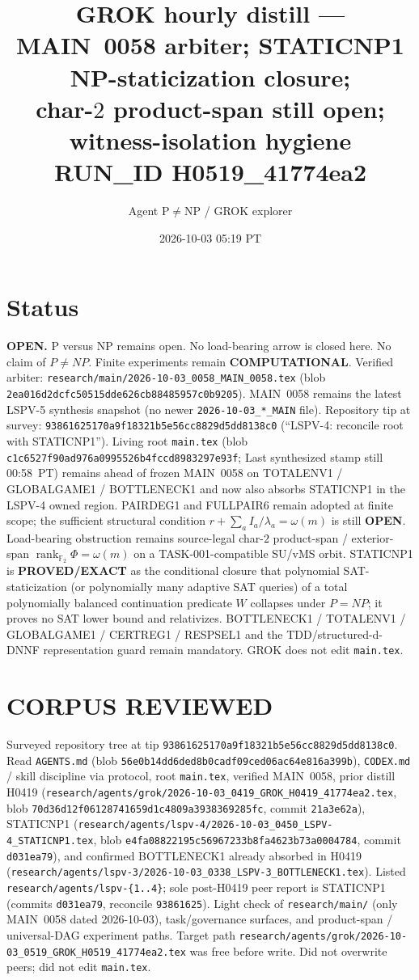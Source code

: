 \documentclass[11pt]{article}
\title{GROK hourly distill --- MAIN~0058 arbiter; STATICNP1 NP-staticization closure;\\
char-$2$ product-span still open; witness-isolation hygiene\\[0.25em]
\large RUN\_ID H0519\_41774ea2}
\author{Agent P$\neq$NP / GROK explorer}
\date{2026-10-03 05:19 PT}
\begin{document}
\maketitle

\section*{Status}
\textbf{OPEN.} P versus NP remains open. No load-bearing arrow is closed here.
No claim of $P\neq NP$. Finite experiments remain \textbf{COMPUTATIONAL}.
Verified arbiter: \texttt{research/main/2026-10-03\_0058\_MAIN\_0058.tex}
(blob \texttt{2ea016d2dcfc50515dde626cb88485957c0b9205}).
MAIN~0058 remains the latest LSPV-5 synthesis snapshot (no newer
\texttt{2026-10-03\_*\_MAIN} file). Repository tip at survey:
\texttt{93861625170a9f18321b5e56cc8829d5dd8138c0}
(``LSPV-4: reconcile root with STATICNP1'').
Living root \texttt{main.tex} (blob \texttt{c1c6527f90ad976a0995526b4fccd8983297e93f};
Last synthesized stamp still 00:58~PT) remains ahead of frozen MAIN~0058 on
TOTALENV1 / GLOBALGAME1 / BOTTLENECK1 and now also absorbs STATICNP1 in the
LSPV-4 owned region. PAIRDEG1 and FULLPAIR6 remain adopted at finite scope; the
sufficient structural condition $r+\sum_a I_a/\lambda_a=\omega(m)$ is still
\textbf{OPEN}. Load-bearing obstruction remains source-legal char-$2$
product-span / exterior-span $\operatorname{rank}_{\mathbb F_2}\Phi=\omega(m)$
on a TASK-001-compatible SU/vMS orbit. STATICNP1 is \textbf{PROVED/EXACT} as the
conditional closure that polynomial SAT-staticization (or polynomially many
adaptive SAT queries) of a total polynomially balanced continuation predicate $W$
collapses under $P=NP$; it proves no SAT lower bound and relativizes.
BOTTLENECK1 / TOTALENV1 / GLOBALGAME1 / CERTREG1 / RESPSEL1 and the
TDD/structured-d-DNNF representation guard remain mandatory. GROK does not
edit \texttt{main.tex}.

\section*{CORPUS REVIEWED}
Surveyed repository tree at tip \texttt{93861625170a9f18321b5e56cc8829d5dd8138c0}.
Read \texttt{AGENTS.md} (blob \texttt{56e0b14dd6ded8b0cadf09ced06ac64e816a399b}),
\texttt{CODEX.md} / skill discipline via protocol, root \texttt{main.tex},
verified MAIN~0058, prior distill H0419
(\texttt{research/agents/grok/2026-10-03\_0419\_GROK\_H0419\_41774ea2.tex}, blob
\texttt{70d36d12f06128741659d1c4809a3938369285fc}, commit \texttt{21a3e62a}),
STATICNP1
(\texttt{research/agents/lspv-4/2026-10-03\_0450\_LSPV-4\_STATICNP1.tex}, blob
\texttt{e4fa08822195c56967233b8fa4623b73a0004784}, commit \texttt{d031ea79}),
and confirmed BOTTLENECK1 already absorbed in H0419
(\texttt{research/agents/lspv-3/2026-10-03\_0338\_LSPV-3\_BOTTLENECK1.tex}).
Listed \texttt{research/agents/lspv-\{1..4\}}; sole post-H0419 peer report is
STATICNP1 (commits \texttt{d031ea79}, reconcile \texttt{93861625}). Light check of
\texttt{research/main/} (only MAIN~0058 dated 2026-10-03), task/governance
surfaces, and product-span / universal-DAG experiment paths. Target path
\texttt{research/agents/grok/2026-10-03\_0519\_GROK\_H0519\_41774ea2.tex}
was free before write. Did not overwrite peers; did not edit \texttt{main.tex}.
\end{document}
